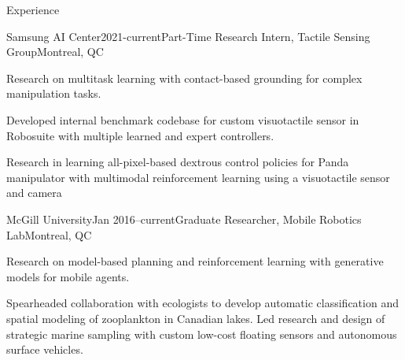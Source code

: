 \documentclass{resume} %
\begin{document}
\begin{rSection}{Experience}
\begin{rSubsection}{Samsung AI Center}{2021-current}{Part-Time Research Intern, Tactile Sensing Group}{Montreal, QC}
\item{Research on multitask learning with contact-based grounding for complex manipulation tasks. }
\item{Developed internal benchmark codebase for custom visuotactile sensor in Robosuite with multiple learned and expert controllers. }
\item{Research in learning all-pixel-based dextrous control policies for Panda manipulator with multimodal reinforcement learning using a visuotactile sensor and camera}
\end{rSubsection}
	\vspace{-.2cm}
\begin{rSubsection}{McGill University}{Jan 2016--current}{Graduate Researcher, Mobile Robotics Lab}{Montreal, QC}
\item{Research on model-based planning and reinforcement learning with generative models for mobile agents.}
\item{Spearheaded collaboration with ecologists to develop automatic classification and spatial modeling of zooplankton in Canadian lakes. Led research and design of strategic marine sampling with custom low-cost floating sensors and autonomous surface vehicles.}
\end{rSubsection}
	\vspace{-.2cm}


\end{rSection}
\end{document}
